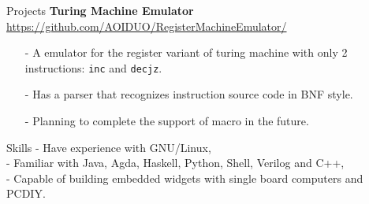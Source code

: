 \documentclass{resume} %
\newcommand{\itemsepval}{-6pt}
\newcommand{\code}{\texttt}
\begin{document}
\begin{rSection}{Projects}
    \textbf{Turing Machine Emulator} \hfill \\ 
    \url{https://github.com/AOIDUO/RegisterMachineEmulator/} \hfill \par
    \begin{itemize}
        \itemsep \itemsepval {} 
        
        \item[-] A emulator for the register variant of turing machine with only 2 instructions: \code{inc} and \code{decjz}.
        \item[-] Has a parser that recognizes instruction source code in BNF style.
        \item[-] Planning to complete the support of macro in the future.
    \end{itemize}


\end{rSection} 

\begin{rSection}{Skills}
    - Have experience with GNU/Linux, \\
    - Familiar with Java, Agda, Haskell, Python, Shell, Verilog and C++, \\
    - Capable of building embedded widgets with single board computers and PCDIY.

\end{rSection} 
\end{document}
